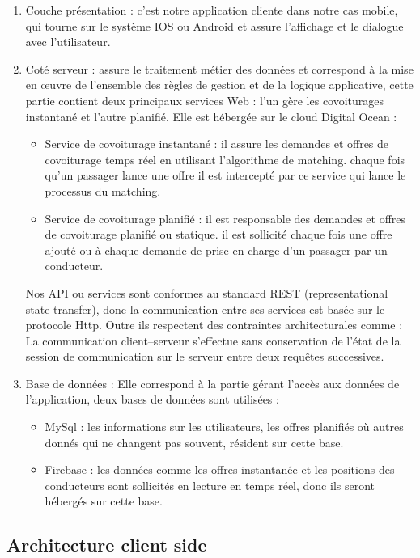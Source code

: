 \begin{enumerate}
	\item Couche présentation : c'est notre application cliente dans notre cas mobile, qui tourne sur le système IOS ou Android et assure l'affichage et le dialogue avec l'utilisateur.
	\item Coté serveur : assure le traitement métier des données et correspond à la mise en œuvre de l'ensemble des règles de gestion et de la logique applicative, cette partie contient deux principaux services Web : l'un gère les covoiturages instantané et l'autre planifié. Elle est hébergée sur le cloud Digital Ocean :
	\begin{itemize}
		\item Service de covoiturage instantané : il assure les demandes et offres de covoiturage temps réel en utilisant l'algorithme de matching. chaque fois qu'un passager lance une offre il est intercepté par ce service qui lance le processus du matching. 
		\item Service de covoiturage planifié : il est responsable des demandes et offres de covoiturage planifié ou statique. il est sollicité chaque fois une offre ajouté ou à chaque demande de prise en charge d'un passager par un conducteur.
	\end{itemize}
	Nos API ou services sont conformes au standard REST (representational state transfer), donc la communication entre ses services est basée sur le protocole Http. Outre ils respectent des contraintes architecturales comme : La communication client–serveur s'effectue sans conservation de l'état de la session de communication sur le serveur entre deux requêtes successives.\cite{fielding2000architectural}
	\item Base de données : Elle correspond à la partie gérant l'accès aux données de l'application, deux bases de données sont utilisées :
	\begin{itemize}
		\item MySql : les informations sur les utilisateurs, les offres planifiés où autres donnés qui ne changent pas souvent, résident sur cette base.
		\item Firebase : les données comme les offres instantanée et les positions des conducteurs sont sollicités en lecture en temps réel, donc ils seront hébergés sur cette base.
	\end{itemize}
\end{enumerate}
\subsection{Architecture client side}
